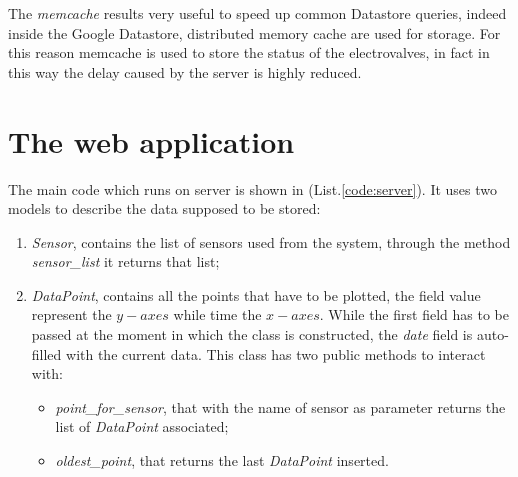 The \textit{memcache} results very useful to speed up common Datastore queries, indeed inside the Google Datastore, distributed memory cache are used for storage.
For this reason memcache is used to store the status of the electrovalves, in fact in this way the delay caused by the server is highly reduced.

\section{The web application}

The main code which runs on server is shown in (List.\ref{code:server}). It uses two models to describe the data supposed to be stored:
\begin{enumerate}
	\item \textit{Sensor}, contains the list of sensors used from the system, through the method \textit{sensor\_list} it returns that list;
	\item \textit{DataPoint}, contains all the points that have to be plotted, the field value represent the $y-axes$ while time the $x-axes$. While the first field has to be passed at the moment in which the class is constructed, the \textit{date} field is auto-filled with the current data. This class has two public methods to interact with: 
	\begin{itemize}
		\item \textit{point\_for\_sensor}, that with the name of sensor as parameter returns the list of \textit{DataPoint} associated;
		\item \textit{oldest\_point}, that returns the last \textit{DataPoint} inserted.
	\end{itemize} 
 \end{enumerate} 
 
